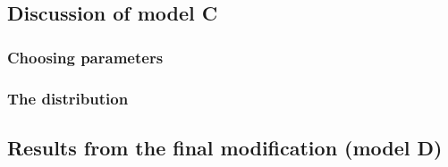 \documentclass[a4paper, 10pt]{article}
\begin{document}
\subsection{Discussion of model C}
\subsubsection{Choosing parameters}

\subsubsection{The distribution}

\subsection{Results from the final modification (model D)}
\end{document}
